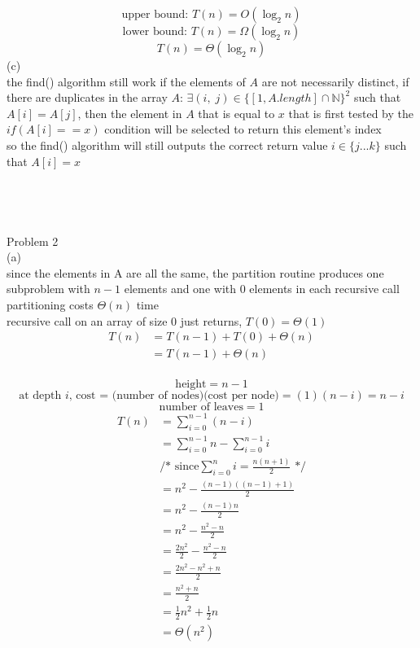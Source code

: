 \documentclass[12pt,border=4pt,multi]{article}%
\begin{document}
\[\text{upper bound: } T(n) = O(\log_2 n)\]
\[\text{lower bound: } T(n) = \Omega(\log_2 n)\]
\[T(n) = \Theta(\log_2 n)\]
\newpage
\noindent
(c)\\
the find() algorithm still work if the elements of $A$ are not necessarily distinct, if there are duplicates in the array $A$: $\exists (i,\; j) \in \{[1, A.length] \cap \mathbb{N}\}^2$ such that $A[i] = A[j]$, then the element in $A$ that is equal to $x$ that is first tested by the $if(A[i] == x)$ condition will be selected to return this element's index\\
so the find() algorithm will still outputs the correct return value $i \in \{j...k\}$ such that $A[i] = x$\\ 
\\
\\
\\
\\
\newpage
\noindent
Problem 2\\
(a)\\
since the elements in A are all the same, the partition routine produces one subproblem with $n - 1$ elements and one with 0 elements in each recursive call\\
partitioning costs $\Theta(n)$ time\\
recursive call on an array of size 0 just returns, $T(0) = \Theta(1)$
\begin{align*}
T(n) &= T(n - 1) + T(0) + \Theta(n)\\
&= T(n - 1) + \Theta(n)\\
\end{align*}
\begin{center}
\end{center}
\[\text{height} = n - 1\]
\[\text{at depth $i$, cost = (number of nodes)(cost per node)} = (1)(n - i) = n - i\]
\[\text{number of leaves} = 1\]
\begin{align*}
    T(n) &=\sum_{i = 0}^{n - 1} (n - i)\\
    &= \sum_{i = 0}^{n - 1} n - \sum_{i = 0}^{n - 1} i\\
    &\text{/* since} \sum_{i = 0}^{n} i = \frac{n(n + 1)}{2} \text{ */}\\
    &= n^2 - \frac{(n - 1)((n - 1) + 1)}{2}\\
    &= n^2 - \frac{(n - 1)n}{2}\\
    &= n^2 - \frac{n^2 - n}{2}\\
    &= \frac{2n^2}{2} - \frac{n^2 - n}{2}\\
    &= \frac{2n^2 - n^2 + n}{2}\\
    &= \frac{n^2 + n}{2}\\
    &= \frac{1}{2}n^2 + \frac{1}{2}n\\
    &= \Theta(n^2)\\
\end{align*}
\end{document}
